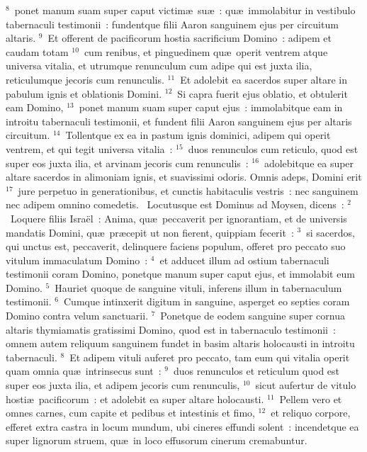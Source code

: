 ${}^{8}$~ponet manum suam super caput victim\ae\ su\ae~: qu\ae\ immolabitur in vestibulo tabernaculi testimonii~: fundentque filii Aaron sanguinem ejus per circuitum altaris.
${}^{9}$~Et offerent de pacificorum hostia sacrificium Domino~: adipem et caudam totam
${}^{10}$~cum renibus, et pinguedinem qu\ae\ operit ventrem atque universa vitalia, et utrumque renunculum cum adipe qui est juxta ilia, reticulumque jecoris cum renunculis.
${}^{11}$~Et adolebit ea sacerdos super altare in pabulum ignis et oblationis Domini.
${}^{12}$~Si capra fuerit ejus oblatio, et obtulerit eam Domino,
${}^{13}$~ponet manum suam super caput ejus~: immolabitque eam in introitu tabernaculi testimonii, et fundent filii Aaron sanguinem ejus per altaris circuitum.
${}^{14}$~Tollentque ex ea in pastum ignis dominici, adipem qui operit ventrem, et qui tegit universa vitalia~:
${}^{15}$~duos renunculos cum reticulo, quod est super eos juxta ilia, et arvinam jecoris cum renunculis~:
${}^{16}$~adolebitque ea super altare sacerdos in alimoniam ignis, et suavissimi odoris. Omnis adeps, Domini erit
${}^{17}$~jure perpetuo in generationibus, et cunctis habitaculis vestris~: nec sanguinem nec adipem omnino comedetis.
~\lettrine[lines=10,image=true,loversize=0.05,lraise=-0.03]{L}{}ocutusque est Dominus ad Moysen, dicens~:
${}^{2}$~Loquere filiis Isra\"el~: Anima, qu\ae\ peccaverit per ignorantiam, et de universis mandatis Domini, qu\ae\ pr\ae cepit ut non fierent, quippiam fecerit~:
${}^{3}$~si sacerdos, qui unctus est, peccaverit, delinquere faciens populum, offeret pro peccato suo vitulum immaculatum Domino~:
${}^{4}$~et adducet illum ad ostium tabernaculi testimonii coram Domino, ponetque manum super caput ejus, et immolabit eum Domino.
${}^{5}$~Hauriet quoque de sanguine vituli, inferens illum in tabernaculum testimonii.
${}^{6}$~Cumque intinxerit digitum in sanguine, asperget eo septies coram Domino contra velum sanctuarii.
${}^{7}$~Ponetque de eodem sanguine super cornua altaris thymiamatis gratissimi Domino, quod est in tabernaculo testimonii~: omnem autem reliquum sanguinem fundet in basim altaris holocausti in introitu tabernaculi.
${}^{8}$~Et adipem vituli auferet pro peccato, tam eum qui vitalia operit quam omnia qu\ae\ intrinsecus sunt~:
${}^{9}$~duos renunculos et reticulum quod est super eos juxta ilia, et adipem jecoris cum renunculis,
${}^{10}$~sicut aufertur de vitulo hosti\ae\ pacificorum~: et adolebit ea super altare holocausti.
${}^{11}$~Pellem vero et omnes carnes, cum capite et pedibus et intestinis et fimo,
${}^{12}$~et reliquo corpore, efferet extra castra in locum mundum, ubi cineres effundi solent~: incendetque ea super lignorum struem, qu\ae\ in loco effusorum cinerum cremabuntur.


